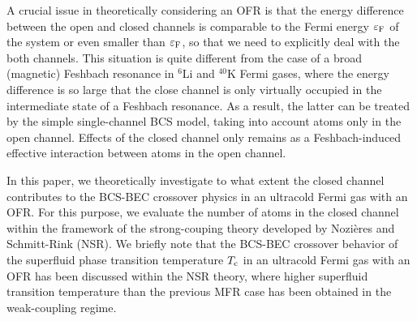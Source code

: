 \documentclass[a4paper]{jpconf}
\begin{document}
\par
A crucial issue in theoretically considering an OFR is that the energy difference between the open and closed channels is comparable to the Fermi energy $\varepsilon_{\rm F}$ of the system or even smaller than $\varepsilon_{\rm F}$, so that we need to explicitly deal with the both channels\cite{Zhang}. This situation is quite different from the case of a broad (magnetic) Feshbach resonance in $^6$Li and $^{40}$K Fermi gases\cite{Chin,Jin,Zwierlein}, where the energy difference is so large that the close channel is only virtually occupied in the intermediate state of a Feshbach resonance. As a result, the latter can be treated by the simple single-channel BCS model, taking into account atoms only in the open channel. Effects of the closed channel only remains as a Feshbach-induced effective interaction between atoms in the open channel.
\par
In this paper, we theoretically investigate to what extent the closed channel contributes to the BCS-BEC crossover physics in an ultracold Fermi gas with an OFR. For this purpose, we evaluate the number of atoms in the closed channel within the framework of the strong-couping theory developed by Nozi\`eres and Schmitt-Rink (NSR)\cite{NSR}. We briefly note that the BCS-BEC crossover behavior of the superfluid phase transition temperature $T_{\rm c}$ in an ultracold Fermi gas with an OFR has been discussed\cite{Junjin} within the NSR theory\cite{NSR}, where higher superfluid transition temperature than the previous MFR case has been obtained in the weak-coupling regime. 
\par
\par
\end{document}
